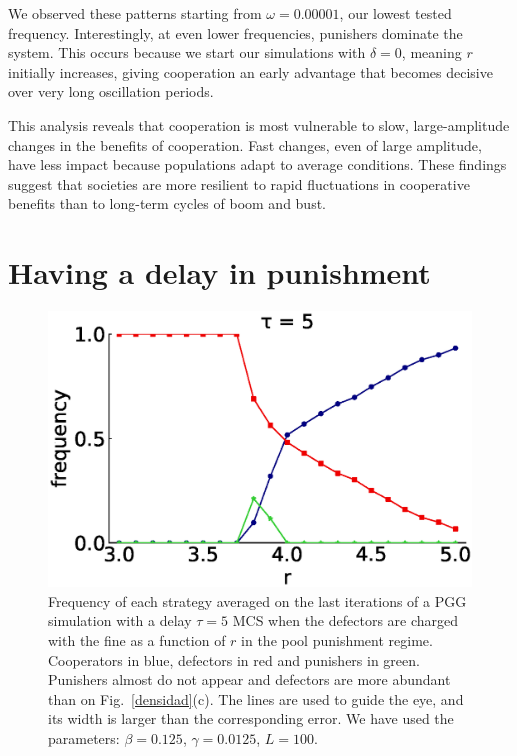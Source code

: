 We observed these patterns starting from $\omega = 0.00001$, our lowest tested frequency. Interestingly, at even lower frequencies, punishers dominate the system. This occurs because we start our simulations with $\delta = 0$, meaning $r$ initially increases, giving cooperation an early advantage that becomes decisive over very long oscillation periods.

This analysis reveals that cooperation is most vulnerable to slow, large-amplitude changes in the benefits of cooperation. Fast changes, even of large amplitude, have less impact because populations adapt to average conditions. These findings suggest that societies are more resilient to rapid fluctuations in cooperative benefits than to long-term cycles of boom and bust.



\section{Having a delay in punishment}
\label{3delay}



\begin{figure}
	\centering
	\includegraphics[width=1\linewidth]{Images/P2/densidad_retardo_tau5.0_L100_T0_t5000_Pool.eps}
	
	\caption{
	Frequency of each strategy averaged on the last iterations of a PGG simulation with a delay $\tau=5$ MCS when the defectors are charged with the fine as a function of $r$ in the pool punishment regime. Cooperators in blue, defectors in red and punishers in green. Punishers almost do not appear and defectors are more abundant than on Fig.~\ref{densidad}(c). The lines are used to guide the eye, and its width is larger than the corresponding error. We have used the parameters: $\beta=0.125$, $\gamma=0.0125$, $L=100$. }
	\label{freq_retardo}
\end{figure}

